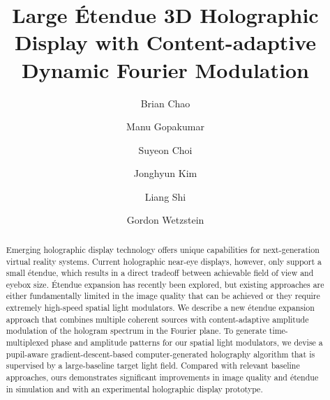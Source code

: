 \documentclass[acmtog]{acmart}
\begin{document}
\title{Large \'Etendue 3D Holographic Display with Content-adaptive Dynamic Fourier Modulation}

\author{Brian Chao}

\author{Manu Gopakumar}

\author{Suyeon Choi}

\author{Jonghyun Kim}


\author{Liang Shi}

\author{Gordon Wetzstein}

\begin{abstract}
Emerging holographic display technology offers unique capabilities for next-generation virtual reality systems. Current holographic near-eye displays, however, only support a small \'etendue, which results in a direct tradeoff between achievable field of view and eyebox size. \'Etendue expansion has recently been explored, but existing approaches are either fundamentally limited in the image quality that can be achieved or they require extremely high-speed spatial light modulators. We describe a new \'etendue expansion approach that combines multiple coherent sources with content-adaptive amplitude modulation of the hologram spectrum in the Fourier plane. To generate time-multiplexed phase and amplitude patterns for our spatial light modulators, we devise a pupil-aware gradient-descent-based computer-generated holography algorithm that is supervised by a large-baseline target light field. Compared with relevant baseline approaches, ours demonstrates significant improvements in image quality and \'etendue in simulation and with an experimental holographic display prototype.
\end{abstract}
\end{document}
